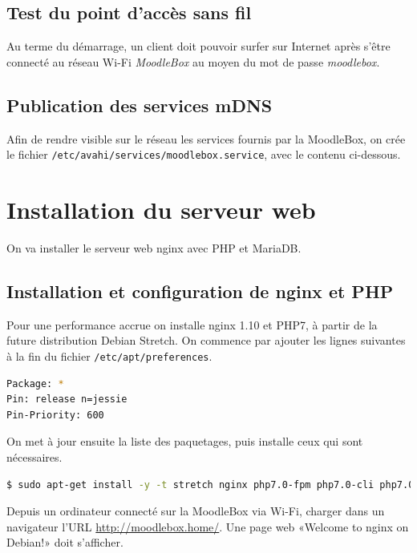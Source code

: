 \documentclass[11pt]{article}
\begin{document}
\subsection{Test du point d'accès sans fil}

\begin{verification}
Au terme du démarrage, un client doit pouvoir surfer sur Internet après s'être connecté au réseau Wi-Fi \emph{MoodleBox} au moyen du mot de passe \emph{moodlebox}.
\end{verification}

\subsection{Publication des services mDNS}

Afin de rendre visible sur le réseau les services fournis par la MoodleBox, on crée le fichier \lstinline{/etc/avahi/services/moodlebox.service}, avec le contenu ci-dessous.


\section{Installation du serveur web}

On va installer le serveur web nginx avec PHP et MariaDB.

\subsection{Installation et configuration de nginx et PHP}

Pour une performance accrue on installe nginx 1.10 et PHP7, à partir de la future distribution Debian Stretch. On commence par ajouter les lignes suivantes à la fin du fichier \lstinline{/etc/apt/preferences}.
\begin{lstlisting}[language=bash]
Package: *
Pin: release n=jessie
Pin-Priority: 600
\end{lstlisting}

On met à jour ensuite la liste des paquetages, puis installe ceux qui sont nécessaires.

\begin{lstlisting}[language=bash]
$ sudo apt-get install -y -t stretch nginx php7.0-fpm php7.0-cli php7.0-xmlrpc php7.0-curl php7.0-gd php7.0-intl php7.0-soap php7.0-mysql php-apcu
\end{lstlisting}

\begin{verification}
Depuis un ordinateur connecté sur la MoodleBox via Wi-Fi, charger dans un navigateur l'URL \url{http://moodlebox.home/}. Une page web «Welcome to nginx on Debian!» doit s'afficher.
\end{verification}
\end{document}
